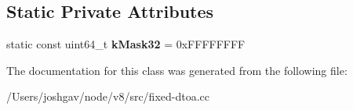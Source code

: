 \subsection*{Static Private Attributes}
\begin{DoxyCompactItemize}
\item 
static const uint64\+\_\+t {\bfseries k\+Mask32} = 0x\+F\+F\+F\+F\+F\+F\+FF\hypertarget{classv8_1_1internal_1_1_u_int128_a6d38c0e3d6885bad9d25db0b1924e719}{}\label{classv8_1_1internal_1_1_u_int128_a6d38c0e3d6885bad9d25db0b1924e719}

\end{DoxyCompactItemize}


The documentation for this class was generated from the following file\+:\begin{DoxyCompactItemize}
\item 
/\+Users/joshgav/node/v8/src/fixed-\/dtoa.\+cc\end{DoxyCompactItemize}

